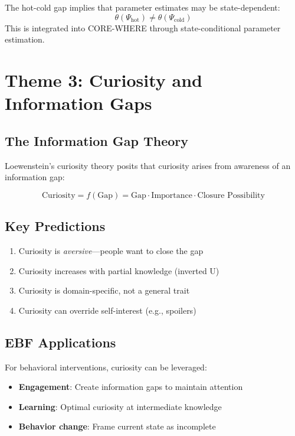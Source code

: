 The hot-cold gap implies that parameter estimates may be state-dependent:
\begin{equation}
\theta(\Psi_{\text{hot}}) \neq \theta(\Psi_{\text{cold}})
\end{equation}
This is integrated into CORE-WHERE through state-conditional parameter estimation.


\section{Theme 3: Curiosity and Information Gaps}
\label{sec:lo-curiosity}

\subsection{The Information Gap Theory}

Loewenstein's curiosity theory \citep{loewenstein1999becausecuriosity} posits that curiosity arises from awareness of an information gap:

\begin{equation}
\text{Curiosity} = f(\text{Gap}) = \text{Gap} \cdot \text{Importance} \cdot \text{Closure Possibility}
\end{equation}

\subsection{Key Predictions}

\begin{enumerate}[nosep]
\item Curiosity is \textit{aversive}---people want to close the gap
\item Curiosity increases with partial knowledge (inverted U)
\item Curiosity is domain-specific, not a general trait
\item Curiosity can override self-interest (e.g., spoilers)
\end{enumerate}

\subsection{EBF Applications}

For behavioral interventions, curiosity can be leveraged:
\begin{itemize}[nosep]
\item \textbf{Engagement}: Create information gaps to maintain attention
\item \textbf{Learning}: Optimal curiosity at intermediate knowledge
\item \textbf{Behavior change}: Frame current state as incomplete
\end{itemize}



